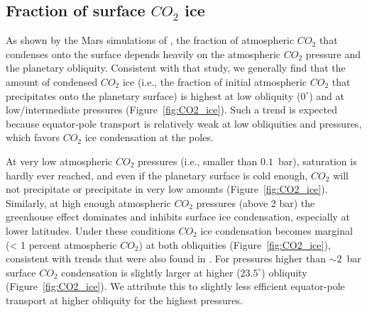 \documentclass[fleqn,usenatbib]{mnras}
\begin{document}
\subsection{Fraction of surface $CO_{\mathrm{2}}$ ice}

As shown by the Mars simulations of \citet{Soto2015}, the fraction of atmospheric $CO_{\mathrm{2}}$ that condenses onto the surface depends heavily on the atmospheric $CO_{\mathrm{2}}$ pressure and the planetary obliquity. Consistent with that study, we generally find that the amount of condensed $CO_{\mathrm{2}}$ ice (i.e., the fraction of initial atmospheric $CO_{\mathrm{2}}$ that precipitates onto the planetary surface) is highest at low obliquity ($0^{\circ}$) and at low/intermediate pressures (Figure~\ref{fig:CO2_ice}). Such a trend is expected because equator-pole transport is relatively weak at low obliquities and pressures, which favors  $CO_{\mathrm{2}}$ ice condensation at the poles. 

At very low atmospheric $CO_{\mathrm{2}}$ pressures (i.e., smaller than $0.1$~bar), saturation is hardly ever reached, and even if the planetary surface is cold enough, $CO_{\mathrm{2}}$ will not precipitate or precipitate in very low amounts (Figure~\ref{fig:CO2_ice}). 
Similarly, at high enough atmospheric $CO_{\mathrm{2}}$ pressures (above 2 bar) the greenhouse effect dominates and inhibits surface ice condensation, especially at lower latitudes. Under these conditions $CO_{\mathrm{2}}$ ice condensation becomes marginal (< 1 percent atmospheric $CO_{\mathrm{2}}$) at both obliquities (Figure~\ref{fig:CO2_ice}), consistent with trends that were also found in \citet{Soto2015}. 
For pressures higher than $\sim2$~bar surface $CO_{\mathrm{2}}$ condensation is slightly larger at higher ($23.5^{\circ}$) obliquity (Figure~\ref{fig:CO2_ice}). We attribute this to slightly less efficient equator-pole transport at higher obliquity for the highest pressures.
\end{document}
